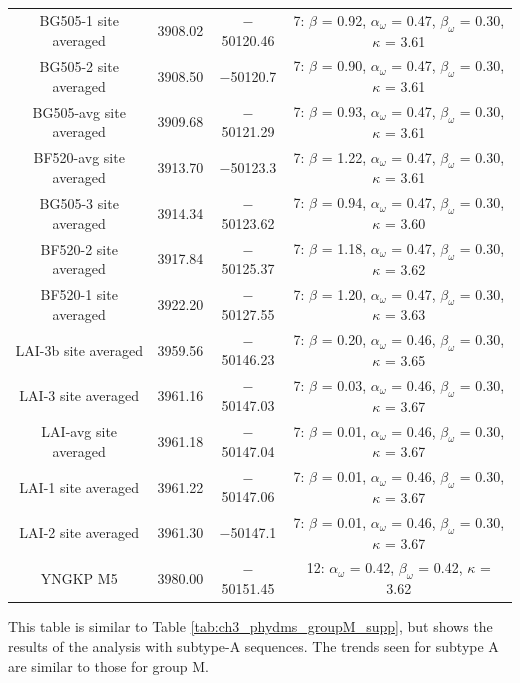 \documentclass[9pt,lineno]{elife}
\begin{document}
\begin{table}
{\begin{tabular}{cccc}
BG505-1 site averaged & 3908.02 & $-$50120.46 & 7: $\beta$ = 0.92, $\alpha_\omega$ = 0.47, $\beta_\omega$ = 0.30, $\kappa$ = 3.61\\
BG505-2 site averaged & 3908.50 & $-$50120.7 & 7: $\beta$ = 0.90, $\alpha_\omega$ = 0.47, $\beta_\omega$ = 0.30, $\kappa$ = 3.61\\
BG505-avg site averaged & 3909.68 & $-$50121.29 & 7: $\beta$ = 0.93, $\alpha_\omega$ = 0.47, $\beta_\omega$ = 0.30, $\kappa$ = 3.61\\
BF520-avg site averaged & 3913.70 & $-$50123.3 & 7: $\beta$ = 1.22, $\alpha_\omega$ = 0.47, $\beta_\omega$ = 0.30, $\kappa$ = 3.61\\
BG505-3 site averaged & 3914.34 & $-$50123.62 & 7: $\beta$ = 0.94, $\alpha_\omega$ = 0.47, $\beta_\omega$ = 0.30, $\kappa$ = 3.60\\
BF520-2 site averaged & 3917.84 & $-$50125.37 & 7: $\beta$ = 1.18, $\alpha_\omega$ = 0.47, $\beta_\omega$ = 0.30, $\kappa$ = 3.62\\
BF520-1 site averaged & 3922.20 & $-$50127.55 & 7: $\beta$ = 1.20, $\alpha_\omega$ = 0.47, $\beta_\omega$ = 0.30, $\kappa$ = 3.63\\
LAI-3b site averaged & 3959.56 & $-$50146.23 & 7: $\beta$ = 0.20, $\alpha_\omega$ = 0.46, $\beta_\omega$ = 0.30, $\kappa$ = 3.65\\
LAI-3 site averaged & 3961.16 & $-$50147.03 & 7: $\beta$ = 0.03, $\alpha_\omega$ = 0.46, $\beta_\omega$ = 0.30, $\kappa$ = 3.67\\
LAI-avg site averaged & 3961.18 & $-$50147.04 & 7: $\beta$ = 0.01, $\alpha_\omega$ = 0.46, $\beta_\omega$ = 0.30, $\kappa$ = 3.67\\
LAI-1 site averaged & 3961.22 & $-$50147.06 & 7: $\beta$ = 0.01, $\alpha_\omega$ = 0.46, $\beta_\omega$ = 0.30, $\kappa$ = 3.67\\
LAI-2 site averaged & 3961.30 & $-$50147.1 & 7: $\beta$ = 0.01, $\alpha_\omega$ = 0.46, $\beta_\omega$ = 0.30, $\kappa$ = 3.67\\
YNGKP M5 & 3980.00 & $-$50151.45 & 12: $\alpha_\omega$ = 0.42, $\beta_\omega$ = 0.42, $\kappa$ = 3.62
\end{tabular}
}
\begin{flushleft}
This table is similar to Table \ref{tab:ch3_phydms_groupM_supp}, but shows the results of the analysis with subtype-A sequences.
The trends seen for subtype A are similar to those for group M.
\end{flushleft}
\label{tab:phydms_subtypeA_supp}
\end{table}
\end{document}
